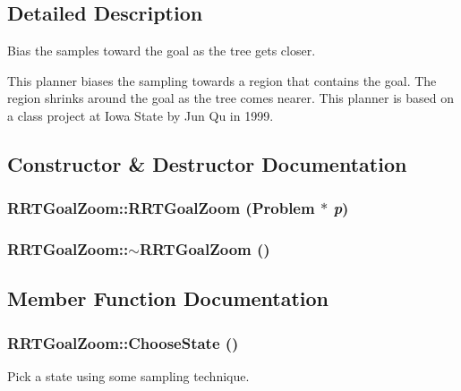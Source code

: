 \subsection{Detailed Description}
Bias the samples toward the goal as the tree gets closer.

This planner biases the sampling towards a region that contains  the goal. The region shrinks around the goal as the tree comes nearer.  This planner is based on a class project at Iowa State by Jun Qu in 1999. 



\subsection{Constructor \& Destructor Documentation}
\subsubsection{\setlength{\rightskip}{0pt plus 5cm}RRTGoal\-Zoom::RRTGoal\-Zoom ({\bf Problem} $\ast$ {\em p})}\label{classRRTGoalZoom_a0}


\subsubsection{\setlength{\rightskip}{0pt plus 5cm}RRTGoal\-Zoom::$\sim$RRTGoal\-Zoom ()\hspace{0.3cm}{\tt  [inline, virtual]}}\label{classRRTGoalZoom_a1}




\subsection{Member Function Documentation}
\subsubsection{ RRTGoal\-Zoom::Choose\-State ()\hspace{0.3cm}{\tt  [protected, virtual]}}\label{classRRTGoalZoom_b0}


Pick a state using some sampling technique.



